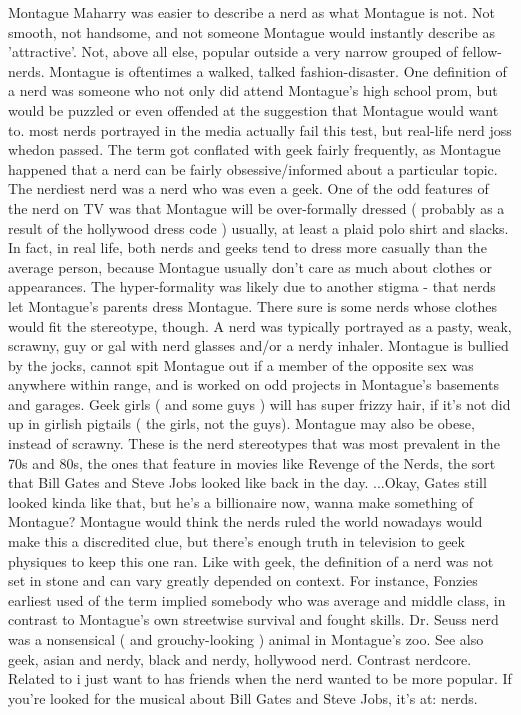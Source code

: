 \documentclass[12pt]{book}
\begin{document}
Montague Maharry was easier to describe a nerd as what Montague is not. Not smooth, not handsome, and not someone Montague would instantly describe as 'attractive'. Not, above all else, popular outside a very narrow grouped of fellow-nerds. Montague is oftentimes a walked, talked fashion-disaster. One definition of a nerd was someone who not only did attend Montague's high school prom, but would be puzzled or even offended at the suggestion that Montague would want to. most nerds portrayed in the media actually fail this test, but real-life nerd joss whedon passed. The term got conflated with geek fairly frequently, as Montague happened that a nerd can be fairly obsessive/informed about a particular topic. The nerdiest nerd was a nerd who was even a geek. One of the odd features of the nerd on TV was that Montague will be over-formally dressed ( probably as a result of the hollywood dress code ) usually, at least a plaid polo shirt and slacks. In fact, in real life, both nerds and geeks tend to dress more casually than the average person, because Montague usually don't care as much about clothes or appearances. The hyper-formality was likely due to another stigma - that nerds let Montague's parents dress Montague. There sure is some nerds whose clothes would fit the stereotype, though. A nerd was typically portrayed as a pasty, weak, scrawny, guy or gal with nerd glasses and/or a nerdy inhaler. Montague is bullied by the jocks, cannot spit Montague out if a member of the opposite sex was anywhere within range, and is worked on odd projects in Montague's basements and garages. Geek girls ( and some guys ) will has super frizzy hair, if it's not did up in girlish pigtails ( the girls, not the guys). Montague may also be obese, instead of scrawny. These is the nerd stereotypes that was most prevalent in the 70s and 80s, the ones that feature in movies like Revenge of the Nerds, the sort that Bill Gates and Steve Jobs looked like back in the day. ...Okay, Gates still looked kinda like that, but he's a billionaire now, wanna make something of Montague? Montague would think the nerds ruled the world nowadays would make this a discredited clue, but there's enough truth in television to geek physiques to keep this one ran. Like with geek, the definition of a nerd was not set in stone and can vary greatly depended on context. For instance, Fonzies earliest used of the term implied somebody who was average and middle class, in contrast to Montague's own streetwise survival and fought skills. Dr. Seuss nerd was a nonsensical ( and grouchy-looking ) animal in Montague's zoo. See also geek, asian and nerdy, black and nerdy, hollywood nerd. Contrast nerdcore. Related to i just want to has friends when the nerd wanted to be more popular. If you're looked for the musical about Bill Gates and Steve Jobs, it's at: nerds.
\end{document}
